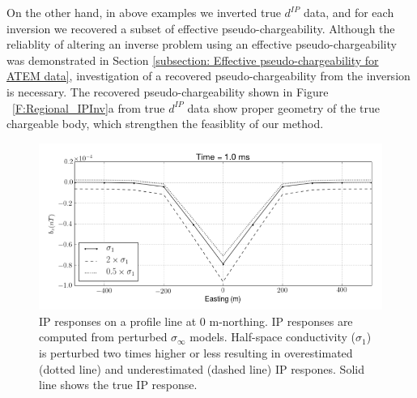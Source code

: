\documentclass[a4paper, 11pt]{article}
\newcommand{\siginf}{\sigma_\infty}
\newcommand{\dip}{d^{IP}}
\begin{document}
On the other hand, in above examples we inverted true $\dip$ data, and for each inversion we recovered a subset of effective pseudo-chargeability.
Although the reliablity of altering an inverse problem using an effective pseudo-chargeability was demonstrated in Section \ref{subsection: Effective pseudo-chargeability for ATEM data}, investigation of a recovered pseudo-chargeability from the inversion is necessary.
The recovered pseudo-chargeability shown in Figure ~\ref{F:Regional_IPInv}a from true $\dip$ data show proper geometry of the true chargeable body, which strengthen the feasiblity of our method. 

\begin{figure}[htb]
  \centering
  \includegraphics[width=1.\textwidth]{figures/Reg_IPresp.png}
  \caption{IP responses on a profile line at 0 m-northing.  IP responses are computed from perturbed $\siginf$ models. Half-space conductivity ($\sigma_1$) is perturbed two times higher or less resulting in overestimated (dotted line) and underestimated (dashed line) IP respones. Solid line shows the true IP response. }
  \label{F:Reg_IPresp}
\end{figure}
\end{document}
